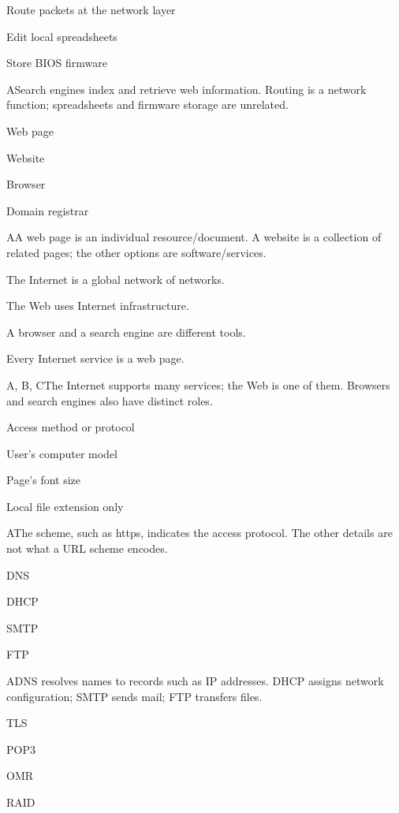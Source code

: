 \begin{enumerate}[label=\textbf{Q\arabic*.}, leftmargin=*]
{   \item Route packets at the network layer
   \item Edit local spreadsheets
   \item Store BIOS firmware}
  {A}{Search engines index and retrieve web information. Routing is a network function; spreadsheets and firmware storage are unrelated.}
  {\item Web page
   \item Website
   \item Browser
   \item Domain registrar}
  {A}{A web page is an individual resource/document. A website is a collection of related pages; the other options are software/services.}
  {\item The Internet is a global network of networks.
   \item The Web uses Internet infrastructure.
   \item A browser and a search engine are different tools.
   \item Every Internet service is a web page.}
  {A, B, C}{The Internet supports many services; the Web is one of them. Browsers and search engines also have distinct roles.}
\fi
\ifnum{}
  {\item Access method or protocol
   \item User's computer model
   \item Page's font size
   \item Local file extension only}
  {A}{The scheme, such as https, indicates the access protocol. The other details are not what a URL scheme encodes.}
  {\item DNS
   \item DHCP
   \item SMTP
   \item FTP}
  {A}{DNS resolves names to records such as IP addresses. DHCP assigns network configuration; SMTP sends mail; FTP transfers files.}
  {\item TLS
   \item POP3
   \item OMR
   \item RAID}

\end{enumerate}
